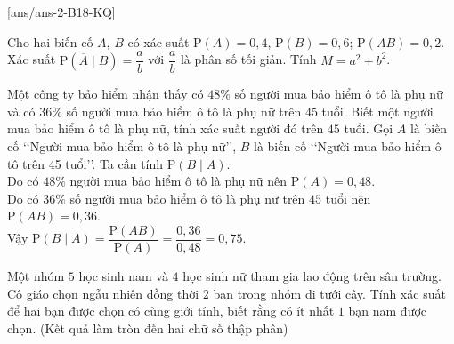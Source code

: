 [ans/ans-2-B18-KQ]
\caukq
\begin{ex}%
	Cho hai biến cố $A$, $B$ có xác suất $\mathrm{P}(A)=0{,}4$, $\mathrm{P}(B)=0{,}6$; $\mathrm{P}(AB)=0{,}2$. Xác suất $\mathrm{P}(\overline{A}\mid B)=\dfrac{a}{b}$ với $\dfrac{a}{b}$ là phân số tối giản. Tính $M=a^2+b^2$.
\end{ex}

\begin{ex}%
	Một công ty bảo hiểm nhận thấy có $48 \%$ số người mua bảo hiểm ô tô là phụ nữ và có $36 \%$ số người mua bảo hiểm ô tô là phụ nữ trên $45$ tuổi. Biết một người mua bảo hiểm ô tô là phụ nữ, tính xác suất người đó trên $45$ tuổi.
	\loigiai
	{
		Gọi $A$ là biến cố \lq\lq Người mua bảo hiểm ô tô là phụ nữ\rq\rq, $B$ là biến cố \lq\lq Người mua bảo hiểm ô tô trên 45 tuổi\rq\rq. Ta cần tính $\mathrm{P}(B \mid A)$.\\
		Do có $48 \%$ người mua bảo hiểm ô tô là phụ nữ nên $\mathrm{P}(A)=0{,}48$.\\
		Do có $36 \%$ số người mua bảo hiểm ô tô là phụ nữ trên $45$ tuổi nên $\mathrm{P}(A B)=0{,}36$.\\
		Vậy $\mathrm{P}(B \mid A)=\dfrac{\mathrm{P}(A B)}{\mathrm{P}(A)}=\dfrac{0{,}36}{0{,}48}=0{,}75$.  
	}
\end{ex}
\begin{ex}%
	Một nhóm $5$ học sinh nam và $4$ học sinh nữ tham gia lao động trên sân trường. Cô giáo chọn ngẫu nhiên đồng thời $2$ bạn trong nhóm đi tưới cây. Tính xác suất để hai bạn được chọn có cùng giới tính, biết rằng có ít nhất $1$ bạn nam được chọn.	(Kết quả làm tròn đến hai chữ số thập phân)
\end{ex}
